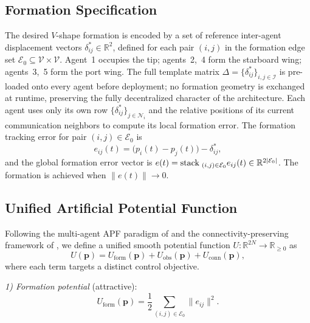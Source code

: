 \documentclass[letterpaper, 10 pt, journal, twoside]{IEEEtran}
\newcommand{\stack}{{\rm stack\;}}
\newcommand{\R}{\mathbb{R}}
\def\scr#1{{\mathcal #1}}
\begin{document}
\subsection{Formation Specification}
\label{sec:formation}

The desired $V$-shape formation is encoded by a set of reference
inter-agent displacement vectors
$\delta_{ij}^{*}\in\R^{2}$, defined for each pair $(i,j)$ in the
formation edge set $\scr{E}_{0}\subseteq\scr{V}\times\scr{V}$.  Agent~1
occupies the tip; agents~2,~4 form the starboard wing; agents~3,~5 form
the port wing.  The full template matrix
$\Delta=\{\delta_{ij}^{*}\}_{i,j\in\scr{I}}$ is pre-loaded onto every
agent before deployment; no formation geometry is exchanged at runtime,
preserving the fully decentralized character of the architecture.  Each
agent uses only its own row $\{\delta_{ij}^{*}\}_{j\in\scr{N}_{i}}$ and
the relative positions of its current communication neighbors to compute
its local formation error.  The formation tracking error for pair
$(i,j)\in\scr{E}_{0}$ is
\begin{equation}
  e_{ij}(t)=\bigl(p_{i}(t)-p_{j}(t)\bigr)-\delta_{ij}^{*},
  \label{eq:form_error}
\end{equation}
and the global formation error vector is
$e(t)=\stack_{(i,j)\in\scr{E}_{0}} e_{ij}(t)\in\R^{2|\scr{E}_{0}|}$.
The formation is achieved when $\|e(t)\|\to 0$.

\subsection{Unified Artificial Potential Function}

Following the multi-agent APF paradigm of \cite{leonard2001P4ICDCCN} and
the connectivity-preserving framework of \cite{kan2012ITAC}, we define a
unified smooth potential function $U:\R^{2N}\to\R_{\geq 0}$ as
\begin{equation}
  U(\mathbf{p})=U_{\mathrm{form}}(\mathbf{p})+U_{\mathrm{obs}}(\mathbf{p})
               +U_{\mathrm{conn}}(\mathbf{p}),
  \label{eq:total_U}
\end{equation}
where each term targets a distinct control objective.

\textit{1) Formation potential} (attractive):
\begin{equation}
  U_{\mathrm{form}}(\mathbf{p})=\frac{1}{2}
  \sum_{(i,j)\in\scr{E}_{0}}\|e_{ij}\|^{2}.
  \label{eq:U_form}
\end{equation}
\end{document}
